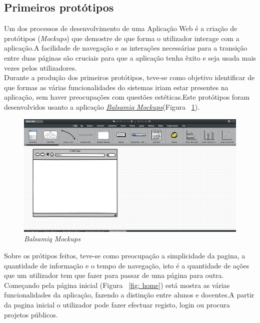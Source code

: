 \subsection{Primeiros protótipos}

Um dos processos de desenvolvimento de uma Aplicação Web é a criação de protótipos (\emph{Mockups}) que demostre de que forma o utilizador interage com a aplicação.A facilidade de navegação e as interações necessárias para a transição entre duas páginas são cruciais para que a aplicação tenha êxito e seja usada mais vezes pelos utilizadores. \\
Durante a produção dos primeiros protótipos, teve-se como objetivo identificar de que formas as várias funcionalidades do sistemas iriam estar presentes na aplicação, sem haver preocupações com questões estéticas.Este protótipos foram desenvolvidos usanto a aplicação \href{http://balsamiq.com/products/mockups/}{\emph{Balsamiq Mockups}}(Figura ~\ref{fig: balsamiq}).\\

\begin{figure}[htbp]
        \centering
        \includegraphics[width=1\textwidth]{images/prototipos/mockups/balsamiq.png}
         \caption{\emph{Balsamiq Mockups}}
         \label{fig: balsamiq}
\end{figure}

Sobre os prótipos feitos, teve-se como preocupação a simplicidade da pagina, a quantidade de informação e o tempo de navegação, isto é a quantidade de ações que um utilizador tem que fazer para passar de uma página para outra.\\
Começando pela página inicial (Figura ~\ref{fig: home}) está mostra as várias funcionalidades da aplicação, fazendo a distinção entre alunos e docentes.A partir da pagina inicial o utilizador pode fazer efectuar registo, login ou procura projetos públicos. \\

